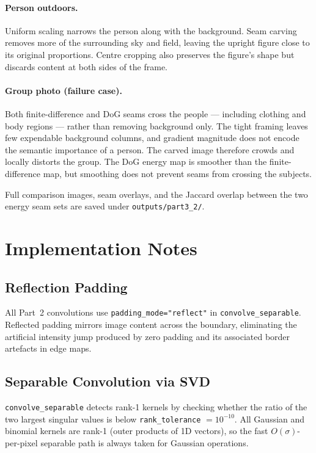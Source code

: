\documentclass[12pt,a4paper]{article}
\begin{document}
\paragraph{Person outdoors.}
Uniform scaling narrows the person along with the background.  Seam carving
removes more of the surrounding sky and field, leaving the upright figure
close to its original proportions.  Centre cropping also preserves the
figure's shape but discards content at both sides of the frame.

\paragraph{Group photo (failure case).}
Both finite-difference and DoG seams cross the people --- including clothing
and body regions --- rather than removing background only.  The tight framing
leaves few expendable background columns, and gradient magnitude does not
encode the semantic importance of a person.  The carved image therefore
crowds and locally distorts the group.  The DoG energy map is smoother than
the finite-difference map, but smoothing does not prevent seams from crossing
the subjects.

Full comparison images, seam overlays, and the Jaccard overlap between the
two energy seam sets are saved under \texttt{outputs/part3\_2/}.

\appendix
\section{Implementation Notes}

\subsection{Reflection Padding}

All Part~2 convolutions use \texttt{padding\_mode="reflect"} in
\texttt{convolve\_separable}.  Reflected padding mirrors image content across
the boundary, eliminating the artificial intensity jump produced by zero
padding and its associated border artefacts in edge maps.

\subsection{Separable Convolution via SVD}

\texttt{convolve\_separable} detects rank-1 kernels by checking whether the
ratio of the two largest singular values is below \texttt{rank\_tolerance}
$=10^{-10}$.  All Gaussian and binomial kernels are rank-1 (outer products
of 1D vectors), so the fast $O(\sigma)$-per-pixel separable path is always
taken for Gaussian operations.
\end{document}
